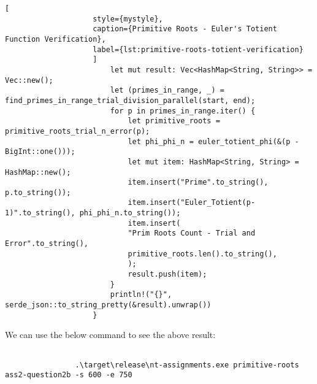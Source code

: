 \documentclass[11pt,a4paper,fleqn]{article}
\begin{document}
\begin{enumerate}[1.]
\begin{enumerate}[a.]
\begin{flushleft}
\begin{lstlisting}[
					style={mystyle},
					caption={Primitive Roots - Euler's Totient Function Verification},
					label={lst:primitive-roots-totient-verification}
					]
						let mut result: Vec<HashMap<String, String>> = Vec::new();
						let (primes_in_range, _) = find_primes_in_range_trial_division_parallel(start, end);
						for p in primes_in_range.iter() {
							let primitive_roots = primitive_roots_trial_n_error(p);
							let phi_phi_n = euler_totient_phi(&(p - BigInt::one()));
							let mut item: HashMap<String, String> = HashMap::new();
							item.insert("Prime".to_string(), p.to_string());
							item.insert("Euler_Totient(p-1)".to_string(), phi_phi_n.to_string());
							item.insert(
							"Prim Roots Count - Trial and Error".to_string(),
							primitive_roots.len().to_string(),
							);
							result.push(item);
						}
						println!("{}", serde_json::to_string_pretty(&result).unwrap())
					}
				\end{lstlisting}

				\bigbreak
				We can use the below command to see the above result:
				\begin{lstlisting}[style=DOS, caption=Verify Primitive Roots Counting using Totient Function]

				.\target\release\nt-assignments.exe primitive-roots ass2-question2b -s 600 -e 750
				\end{lstlisting}
			\end{flushleft}


\end{enumerate}
\end{enumerate}
\end{document}

